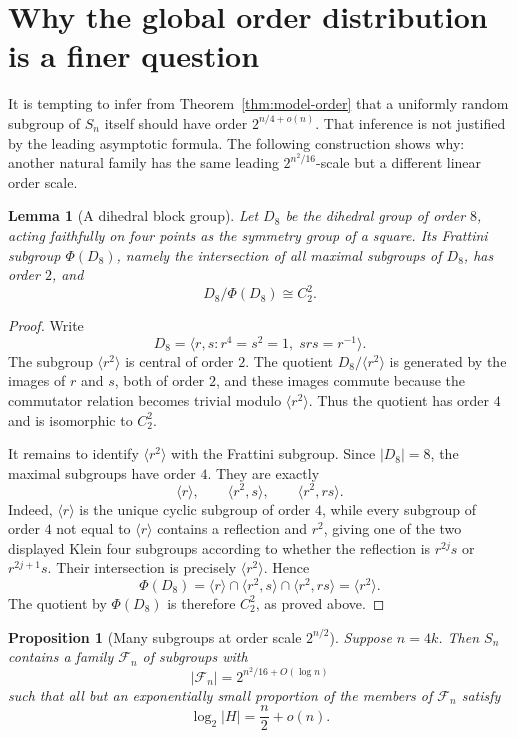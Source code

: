 \documentclass[a4paper,11pt]{amsart}
\newtheorem{proposition}[theorem]{Proposition}
\newtheorem{lemma}[theorem]{Lemma}
\theoremstyle{remark}
\begin{document}
\section{Why the global order distribution is a finer question}\label{sec:dihedral}

It is tempting to infer from Theorem~\ref{thm:model-order} that a uniformly random subgroup of
\(S_n\) itself should have order \(2^{n/4+o(n)}\). That inference is not justified by the leading
asymptotic formula. The following construction shows why: another natural family has the same
leading \(2^{n^2/16}\)-scale but a different linear order scale.

\begin{lemma}[A dihedral block group]\label{lem:dihedral-block}
Let \(D_8\) be the dihedral group of order \(8\), acting faithfully on four points as the symmetry
group of a square. Its Frattini subgroup \(\Phi(D_8)\), namely the intersection of all maximal
subgroups of \(D_8\), has order \(2\), and
\[
        D_8/\Phi(D_8)\cong C_2^2.
\]
\end{lemma}

\begin{proof}
Write
\[
        D_8=\langle r,s:r^4=s^2=1,\;srs=r^{-1}\rangle.
\]
The subgroup \(\langle r^2\rangle\) is central of order \(2\). The quotient
\(D_8/\langle r^2\rangle\) is generated by the images of \(r\) and \(s\), both of order \(2\), and
these images commute because the commutator relation becomes trivial modulo \(\langle r^2\rangle\).
Thus the quotient has order \(4\) and is isomorphic to \(C_2^2\).

It remains to identify \(\langle r^2\rangle\) with the Frattini subgroup. Since \(|D_8|=8\), the
maximal subgroups have order \(4\). They are exactly
\[
        \langle r\rangle,
        \qquad
        \langle r^2,s\rangle,
        \qquad
        \langle r^2,rs\rangle.
\]
Indeed, \(\langle r\rangle\) is the unique cyclic subgroup of order \(4\), while every subgroup of
order \(4\) not equal to \(\langle r\rangle\) contains a reflection and \(r^2\), giving one of the
two displayed Klein four subgroups according to whether the reflection is \(r^{2j}s\) or
\(r^{2j+1}s\). Their intersection is precisely \(\langle r^2\rangle\). Hence
\[
        \Phi(D_8)=\langle r\rangle\cap \langle r^2,s\rangle\cap\langle r^2,rs\rangle
        =\langle r^2\rangle.
\]
The quotient by \(\Phi(D_8)\) is therefore \(C_2^2\), as proved above.
\end{proof}

\begin{proposition}[Many subgroups at order scale \(2^{n/2}\)]\label{prop:dihedral-family}
Suppose \(n=4k\). Then \(S_n\) contains a family \(\mathcal F_n\) of subgroups with
\[
        |\mathcal F_n|=2^{n^2/16+O(\log n)}
\]
such that all but an exponentially small proportion of the members of \(\mathcal F_n\) satisfy
\[
        \log_2 |H|=\frac n2+o(n).
\]
\end{proposition}
\end{document}
